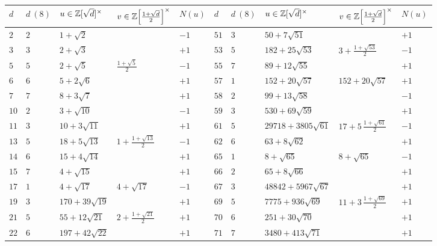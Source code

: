 \begin{figure}
  \begin{center}\def\arraystretch{1.65}\small
    \begin{tabular}{M{0.3cm}M{0.4cm}M{2.5cm}M{2.1cm}M{0.7cm}|M{0.3cm}M{0.4cm}M{3.3cm}M{2.4cm}M{0.7cm}}
      \hline
      $d$ & $d~(8)$ & $u \in \mathbb{Z} [\sqrt{d}]^\times$ & $v \in \mathbb{Z} \Bigl[\frac{1+\sqrt{d}}{2}\Bigr]^\times$ & $N (u)$ & $d$ & $d~(8)$ & $u \in \mathbb{Z} [\sqrt{d}]^\times$ & $v \in \mathbb{Z} \Bigl[\frac{1+\sqrt{d}}{2}\Bigr]^\times$ & $N (u)$ \\
      \hline
      $2$ & $2$ & $1 + \sqrt{2}$ & & $-1$ & $51$ & $3$ & $50 + 7\sqrt{51}$ & & $+1$ \\
      $3$ & $3$ & $2 + \sqrt{3}$ & & $+1$ & $53$ & $5$ & $182 + 25\sqrt{53}$ & $3 + \frac{1+\sqrt{53}}{2}$ & $-1$ \\
      $5$ & $5$ & $2 + \sqrt{5}$ & $\frac{1+\sqrt{5}}{2}$ & $-1$ & $55$ & $7$ & $89 + 12\sqrt{55}$ & & $+1$ \\
      $6$ & $6$ & $5 + 2\sqrt{6}$ & & $+1$ & $57$ & $1$ & $152 + 20\sqrt{57}$ & $152 + 20\sqrt{57}$ & $+1$ \\
      $7$ & $7$ & $8 + 3\sqrt{7}$ & & $+1$ & $58$ & $2$ & $99 + 13\sqrt{58}$ & & $-1$ \\
      $10$ & $2$ & $3 + \sqrt{10}$ & & $-1$ & $59$ & $3$ & $530 + 69\sqrt{59}$ & & $+1$ \\
      $11$ & $3$ & $10 + 3\sqrt{11}$ & & $+1$ & $61$ & $5$ & $29718 + 3805\sqrt{61}$ & $17 + 5\,\frac{1+\sqrt{61}}{2}$ & $-1$ \\
      $13$ & $5$ & $18 + 5\sqrt{13}$ & $1 + \frac{1+\sqrt{13}}{2}$ & $-1$ & $62$ & $6$ & $63 + 8\sqrt{62}$ & & $+1$ \\
      $14$ & $6$ & $15 + 4\sqrt{14}$ & & $+1$ & $65$ & $1$ & $8 + \sqrt{65}$ & $8 + \sqrt{65}$ & $-1$ \\
      $15$ & $7$ & $4 + \sqrt{15}$ & & $+1$ & $66$ & $2$ & $65 + 8\sqrt{66}$ & & $+1$ \\
      $17$ & $1$ & $4 + \sqrt{17}$ & $4 + \sqrt{17}$ & $-1$ & $67$ & $3$ & $48842 + 5967\sqrt{67}$ & & $+1$ \\
      $19$ & $3$ & $170 + 39\sqrt{19}$ & & $+1$ & $69$ & $5$ & $7775 + 936\sqrt{69}$ & $11 + 3\,\frac{1+\sqrt{69}}{2}$ & $+1$ \\
      $21$ & $5$ & $55 + 12\sqrt{21}$ & $2 + \frac{1+\sqrt{21}}{2}$ & $+1$ & $70$ & $6$ & $251 + 30\sqrt{70}$ & & $+1$ \\
      $22$ & $6$ & $197 + 42\sqrt{22}$ & & $+1$ & $71$ & $7$ & $3480 + 413\sqrt{71}$ & & $+1$ \\

\end{tabular}
\end{center}
\end{figure}

